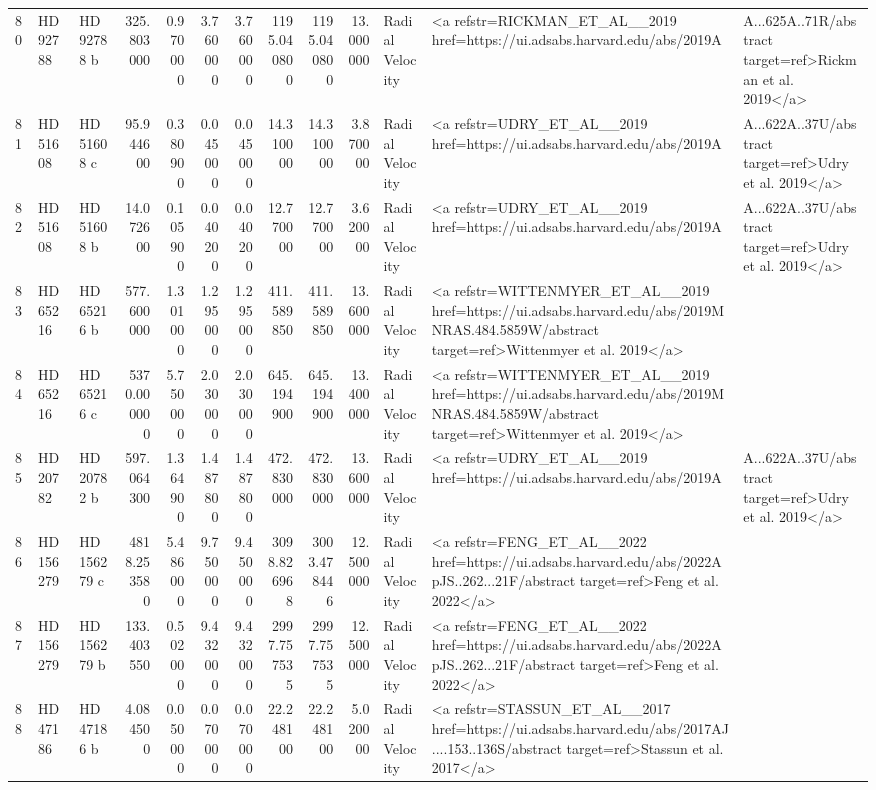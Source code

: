 \begin{tabular}{lllrrrrrrrll}
80 & HD 92788 & HD 92788 b & 325.803000 & 0.970000 & 3.760000 & 3.760000 & 1195.040800 & 1195.040800 & 13.000000 & Radial Velocity & <a refstr=RICKMAN_ET_AL__2019 href=https://ui.adsabs.harvard.edu/abs/2019A&A...625A..71R/abstract target=ref>Rickman et al. 2019</a> \\
81 & HD 51608 & HD 51608 c & 95.944600 & 0.380900 & 0.045000 & 0.045000 & 14.310000 & 14.310000 & 3.870000 & Radial Velocity & <a refstr=UDRY_ET_AL__2019 href=https://ui.adsabs.harvard.edu/abs/2019A&A...622A..37U/abstract target=ref>Udry et al. 2019</a> \\
82 & HD 51608 & HD 51608 b & 14.072600 & 0.105900 & 0.040200 & 0.040200 & 12.770000 & 12.770000 & 3.620000 & Radial Velocity & <a refstr=UDRY_ET_AL__2019 href=https://ui.adsabs.harvard.edu/abs/2019A&A...622A..37U/abstract target=ref>Udry et al. 2019</a> \\
83 & HD 65216 & HD 65216 b & 577.600000 & 1.301000 & 1.295000 & 1.295000 & 411.589850 & 411.589850 & 13.600000 & Radial Velocity & <a refstr=WITTENMYER_ET_AL__2019 href=https://ui.adsabs.harvard.edu/abs/2019MNRAS.484.5859W/abstract target=ref>Wittenmyer et al. 2019</a> \\
84 & HD 65216 & HD 65216 c & 5370.000000 & 5.750000 & 2.030000 & 2.030000 & 645.194900 & 645.194900 & 13.400000 & Radial Velocity & <a refstr=WITTENMYER_ET_AL__2019 href=https://ui.adsabs.harvard.edu/abs/2019MNRAS.484.5859W/abstract target=ref>Wittenmyer et al. 2019</a> \\
85 & HD 20782 & HD 20782 b & 597.064300 & 1.364900 & 1.487800 & 1.487800 & 472.830000 & 472.830000 & 13.600000 & Radial Velocity & <a refstr=UDRY_ET_AL__2019 href=https://ui.adsabs.harvard.edu/abs/2019A&A...622A..37U/abstract target=ref>Udry et al. 2019</a> \\
86 & HD 156279 & HD 156279 c & 4818.253580 & 5.486000 & 9.750000 & 9.450000 & 3098.826968 & 3003.478446 & 12.500000 & Radial Velocity & <a refstr=FENG_ET_AL__2022 href=https://ui.adsabs.harvard.edu/abs/2022ApJS..262...21F/abstract target=ref>Feng et al. 2022</a> \\
87 & HD 156279 & HD 156279 b & 133.403550 & 0.502000 & 9.432000 & 9.432000 & 2997.757535 & 2997.757535 & 12.500000 & Radial Velocity & <a refstr=FENG_ET_AL__2022 href=https://ui.adsabs.harvard.edu/abs/2022ApJS..262...21F/abstract target=ref>Feng et al. 2022</a> \\
88 & HD 47186 & HD 47186 b & 4.084500 & 0.050000 & 0.070000 & 0.070000 & 22.248100 & 22.248100 & 5.020000 & Radial Velocity & <a refstr=STASSUN_ET_AL__2017 href=https://ui.adsabs.harvard.edu/abs/2017AJ....153..136S/abstract target=ref>Stassun et al. 2017</a> \\

\end{tabular}
